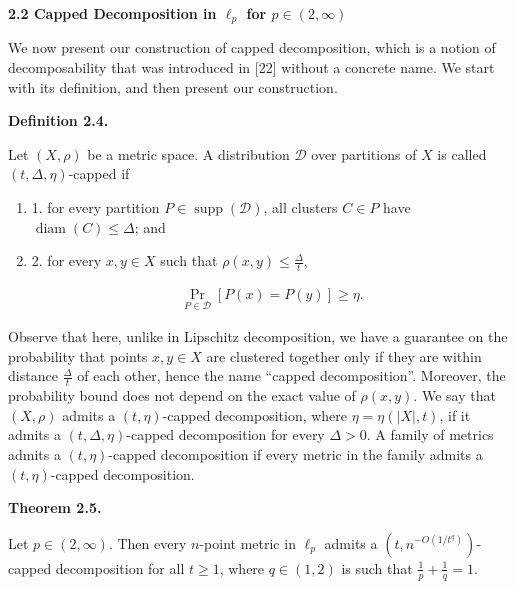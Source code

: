 \documentclass[10pt,a4paper]{amsart}
\begin{document}
\par
\par\medskip\noindent\textbf{2.2 Capped Decomposition in $\ell_{p}$ for $p\in(2,\infty)$}\par
We now present our construction of capped decomposition, which is a notion of decomposability that was introduced in [22] without a concrete name. We start with its definition, and then present our construction.
\par
\par
\par\medskip\noindent\textbf{Definition 2.4.}\par
Let $(X,\rho)$ be a metric space. A distribution $\mathcal{D}$ over partitions of $X$ is called $(t,\Delta,\eta)$-capped if
\par
\begin{enumerate}
\item  1. 
for every partition $P\in\operatorname{supp}(\mathcal{D})$, all clusters $C\in P$ have $\operatorname{diam}(C)\leq\Delta$; and
\par
\par
\item  2. 
for every $x,y\in X$ such that $\rho(x,y)\leq\frac{\Delta}{t}$,
\par
\[\begin{aligned}
\Pr_{P\in\mathcal{D}}[P(x)=P(y)]\geq\eta.
\end{aligned}\]
\par
\end{enumerate}
\par
\par
Observe that here, unlike in Lipschitz decomposition, we have a guarantee on the probability that points $x,y\in X$ are clustered together only if they are within distance $\frac{\Delta}{t}$ of each other, hence the name “capped decomposition”. Moreover, the probability bound does not depend on the exact value of $\rho(x,y)$. We say that $(X,\rho)$ admits a $(t,\eta)$-capped decomposition, where $\eta=\eta(|X|,t)$, if it admits a $(t,\Delta,\eta)$-capped decomposition for every $\Delta>0$. A family of metrics admits a $(t,\eta)$-capped decomposition if every metric in the family admits a $(t,\eta)$-capped decomposition.
\par
\par
\par\medskip\noindent\textbf{Theorem 2.5.}\par
Let $p\in(2,\infty)$. Then every $n$-point metric in $\ell_{p}$ admits a $(t,n^{-O(1/t^{q})})$-capped decomposition for all $t\geq 1$, where $q\in(1,2)$ is such that $\frac{1}{p}+\frac{1}{q}=1$.
\end{document}
